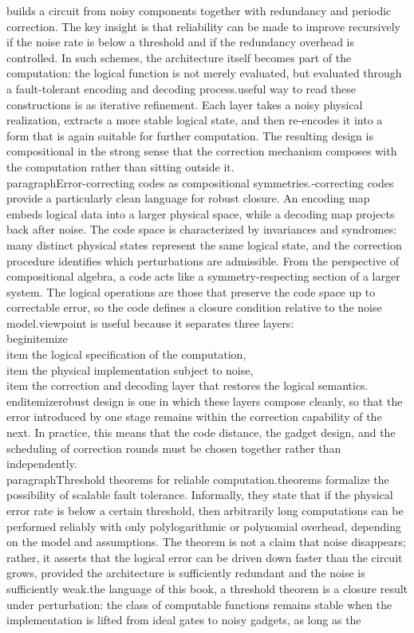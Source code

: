 builds a circuit from noisy components together with redundancy and periodic correction. The key insight is that reliability can be made to improve recursively if the noise rate is below a threshold and if the redundancy overhead is controlled. In such schemes, the architecture itself becomes part of the computation: the logical function is not merely evaluated, but evaluated through a fault-tolerant encoding and decoding process.\n\nA useful way to read these constructions is as iterative refinement. Each layer takes a noisy physical realization, extracts a more stable logical state, and then re-encodes it into a form that is again suitable for further computation. The resulting design is compositional in the strong sense that the correction mechanism composes with the computation rather than sitting outside it.\n\n\\paragraph{Error-correcting codes as compositional symmetries.}\nError-correcting codes provide a particularly clean language for robust closure. An encoding map embeds logical data into a larger physical space, while a decoding map projects back after noise. The code space is characterized by invariances and syndromes: many distinct physical states represent the same logical state, and the correction procedure identifies which perturbations are admissible. From the perspective of compositional algebra, a code acts like a symmetry-respecting section of a larger system. The logical operations are those that preserve the code space up to correctable error, so the code defines a closure condition relative to the noise model.\n\nThis viewpoint is useful because it separates three layers:\n\\begin{itemize}\n  \\item the logical specification of the computation,\n  \\item the physical implementation subject to noise,\n  \\item the correction and decoding layer that restores the logical semantics.\n\\end{itemize}\nA robust design is one in which these layers compose cleanly, so that the error introduced by one stage remains within the correction capability of the next. In practice, this means that the code distance, the gadget design, and the scheduling of correction rounds must be chosen together rather than independently.\n\n\\paragraph{Threshold theorems for reliable computation.}\nThreshold theorems formalize the possibility of scalable fault tolerance. Informally, they state that if the physical error rate is below a certain threshold, then arbitrarily long computations can be performed reliably with only polylogarithmic or polynomial overhead, depending on the model and assumptions. The theorem is not a claim that noise disappears; rather, it asserts that the logical error can be driven down faster than the circuit grows, provided the architecture is sufficiently redundant and the noise is sufficiently weak.\n\nIn the language of this book, a threshold theorem is a closure result under perturbation: the class of computable functions remains stable when the implementation is lifted from ideal gates to noisy gadgets, as long as the 